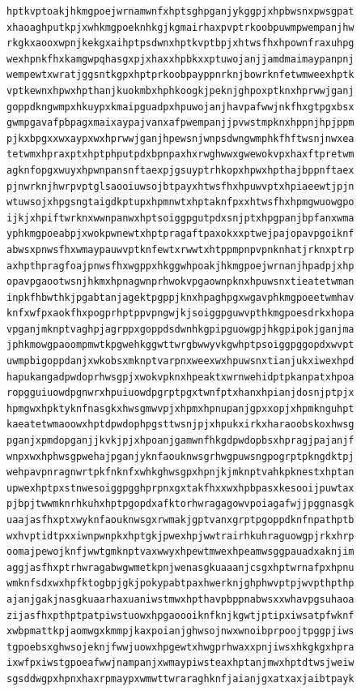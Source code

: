 \documentclass[11pt,letterpaper]{exam}
\begin{document}
\begin{questions}
\begin{verbatim}
hptkvptoakjhkmgpoejwrnamwnfxhptsghpganjykggpjxhpbwsnxpwsgpat
xhaoaghputkpjxwhkmgpoeknhkgjkgmairhaxpvptrkoobpuwmpwempanjhw
rkgkxaooxwpnjkekgxaihptpsdwnxhptkvptbpjxhtwsfhxhpownfraxuhpg
wexhpnkfhxkamgwpqhasgxpjxhaxxhpbkxxptuwojanjjamdmaimaypanpnj
wempewtxwratjggsntkgpxhptprkoobpayppnrknjbowrknfetwmweexhptk
vptkewnxhpwxhpthanjkuokmbxhphkoogkjpeknjghpoxptknxhprwwjganj
goppdkngwmpxhkuypxkmaipguadpxhpuwojanjhavpafwwjnkfhxgtpgxbsx
gwmpgavafpbpagxmaixaypajvanxafpwempanjjpvwstmpknxhppnjhpjppm
pjkxbpgxxwxaypxwxhprwwjganjhpewsnjwnpsdwngwmphkfhftwsnjnwxea
tetwmxhpraxptxhptphputpdxbpnpaxhxrwghwwxgwewokvpxhaxftpretwm
agknfopgxwuyxhpwnpansnftaexpjgsuyptrhkopxhpwxhpthajbppnftaex
pjnwrknjhwrpvptglsaooiuwsojbtpayxhtwsfhxhpuwvptxhpiaeewtjpjn
wtuwsojxhpgsngtaigdkptupxhpmnwtxhptaknfpxxhtwsfhxhpmgwuowgpo
ijkjxhpiftwrknxwwnpanwxhptsoiggpgutpdxsnjptxhpgpanjbpfanxwma
yphkmgpoeabpjxwokpwnewtxhptpragaftpaxokxxptwejpajopavpgoiknf
abwsxpnwsfhxwmaypauwvptknfewtxrwwtxhtppmpnpvpnknhatjrknxptrp
axhpthpragfoajpnwsfhxwgppxhkggwhpoakjhkmgpoejwrnanjhpadpjxhp
opavpgaootwsnjhkmxhpnagwnprhwokvpgaownpknxhpuwsnxtieatetwman
inpkfhbwthkjpgabtanjagektpgppjknxhpaghpgxwgavphkmgpoeetwmhav
knfxwfpxaokfhxpogprhptppvpngwjkjsoiggpguwvpthkmgpoesdrkxhopa
vpganjmknptvaghpjagrppxgoppdsdwnhkgpipguowgpjhkgpipokjganjma
jphkmowgpaoompmwtkpgwehkggwttwrgbwwyvkgwhptpsoiggpggopdxwvpt
uwmpbigoppdanjxwkobsxmknptvarpnxweexwxhpuwsnxtianjukxiwexhpd
hapukangadpwdoprhwsgpjxwokvpknxhpeaktxwrnwehidptpkanpatxhpoa
ropgguiuowdpgnwrxhpuiuowdpgrptpgxtwnfptxhanxhpianjdosnjptpjx
hpmgwxhpktyknfnasgkxhwsgmwvpjxhpmxhpnupanjgpxxopjxhpmknguhpt
kaeatetwmaoowxhptdpwdophpgsttwsnjpjxhpukxirkxharaoobskoxhwsg
pganjxpmdopganjjkvkjpjxhpoanjgamwnfhkgdpwdopbsxhpragjpajanjf
wnpxwxhphwsgpwehajpganjyknfaouknwsgrhwgpuwsngpogrptpkngdktpj
wehpavpnragnwrtpkfnknfxwhkghwsgpxhpnjkjmknptvahkpknestxhptan
upwexhptpxstnwesoiggpgghprpnxgxtakfhxxwxhpbpasxkesooijpuwtax
pjbpjtwwmknrhkuhxhptpgopdxafktorhwragagowvpoiagafwjjpggnasgk
uaajasfhxptxwyknfaouknwsgxrwmakjgptvanxgrptpgoppdknfnpathptb
wxhvptidtpxxiwnpwnpkxhptgkjpwexhpjwwtrairhkuhraguowgpjrkxhrp
oomajpewojknfjwwtgmknptvaxwwyxhpewtmwexhpeamwsggpauadxaknjim
aggjasfhxptrhwragabwgwmetkpnjwenasgkuaaanjcsgxhptwrnafpxhpnu
wmknfsdxwxhpfktogbpjgkjpokypabtpaxhwerknjghphwvptpjwvpthpthp
ajanjgakjnasgkuaarhaxuaniwstmwxhpthavpbppnabwsxxwhavpgsuhaoa
zijasfhxpthptpatpiwstuowxhpgaoooiknfknjkgwtjptipxiwsatpfwknf
xwbpmattkpjaomwgxkmmpjkaxpoianjghwsojnwxwnoibprpoojtpggpjiws
tgpoebsxghwsojeknjfwwjuowxhpgewtxhwgprhwaxxpnjiwsxhkgkgxhpra
ixwfpxiwstgpoeafwwjnampanjxwmaypiwsteaxhptanjmwxhptdtwsjweiw
sgsddwgpxhpnxhaxrpmaypxwmwttwraraghknfjaianjgxatxaxjaibtpayk

\end{verbatim}
\end{questions}
\end{document}
